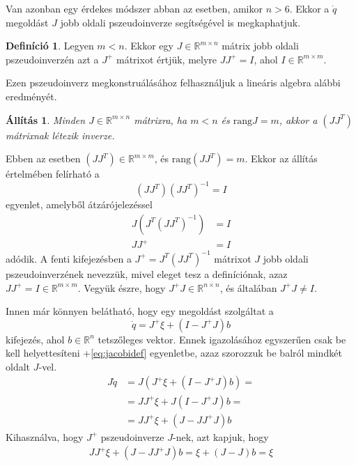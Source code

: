\documentclass[12pt,a4paper]{report}
\newtheorem{áll}[tét]{Állítás}
\theoremstyle{remark}
\theoremstyle{definition}
\newtheorem{defi}{Definíció}[section]
\begin{document}
Van azonban egy érdekes módszer abban az esetben, amikor $n > 6$. Ekkor a $\dot{q}$ megoldást $J$ jobb oldali 
pszeudoinverze segítségével is megkaphatjuk. 
\begin{defi}
Legyen $m < n$. Ekkor egy $J \in \mathbb{R}^{m \times n}$ mátrix jobb oldali pszeudoinverzén azt a $J^+$ mátrixot 
értjük, melyre $JJ^+ = I$, ahol $I \in \mathbb{R}^{m \times m}$.
\end{defi}
Ezen pszeudoinverz megkonstruálásához felhasználjuk a lineáris algebra alábbi eredményét.
\begin{áll}
Minden $J \in \mathbb{R}^{m \times n}$ mátrixra, ha $m < n$ és $\mathrm{rang}J = m$, akkor a $(JJ^T)$ mátrixnak 
létezik inverze.
\end{áll}
Ebben az esetben $(JJ^T) \in \mathbb{R}^{m \times m}$, és $\mathrm{rang}(JJ^T) = m$. Ekkor az állítás értelmében 
felírható a
\begin{equation}
(JJ^T)(JJ^T)^{-1} = I
\end{equation}
egyenlet, amelyből átzárójelezéssel
\begin{equation}
\begin{aligned}
J \left(J^T (JJ^T)^{-1} \right) &= I \\
JJ^+ &= I
\end{aligned}
\end{equation}
adódik. A fenti kifejezésben a $J^+ = J^T (JJ^T)^{-1}$ mátrixot $J$ jobb oldali pszeudoinverzének nevezzük, mivel 
eleget tesz a definíciónak, azaz $JJ^+ = I \in \mathbb{R}^{m \times m}$. Vegyük észre, hogy 
$J^+ J \in \mathbb{R}^{n \times n}$, és általában $J^+ J \neq I$. 

Innen már könnyen belátható, hogy egy megoldást szolgáltat a
\begin{equation}
\dot{q} = J^+ \xi + (I - J^+ J)b
\end{equation}
kifejezés, ahol $b \in \mathbb{R}^n$ tetszőleges vektor. Ennek igazolásához egyszerűen csak be kell helyettesíteni 
\az+\eqref{eq:jacobidef} egyenletbe, azaz szorozzuk be balról mindkét oldalt $J$-vel.
\begin{equation}
\begin{aligned}
J\dot{q} &= J \left(J^+ \xi + (I - J^+ J)b \right) = \\
    &= JJ^+ \xi + J(I - J^+ J)b = \\
    &= JJ^+ \xi + (J - JJ^+ J)b
\end{aligned}
\end{equation}
Kihasználva, hogy $J^+$ pszeudoinverze $J$-nek, azt kapjuk, hogy
\begin{equation}
\begin{aligned}
JJ^+ \xi + (J - JJ^+ J)b = \xi + (J - J)b = \xi
\end{aligned}
\end{equation}
\end{document}
